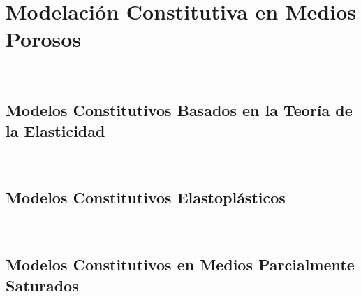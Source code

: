 %





\chapter{Modelación Constitutiva en Medios Porosos}~\hypertarget{ch:chapter_05}{}
\label{ch:chapter_05}

\lipsum[1-2]

\bigskip

\section{Modelos Constitutivos Basados en la Teoría de la Elasticidad}~\hypertarget{sec:sec510}{}
\label{sec:sec510}


\section{Modelos Constitutivos Elastoplásticos}~\hypertarget{sec:sec520}{}
\label{sec:sec520}


\section{Modelos Constitutivos en Medios Parcialmente Saturados}~\hypertarget{sec:sec530}{}
\label{sec:sec530}


